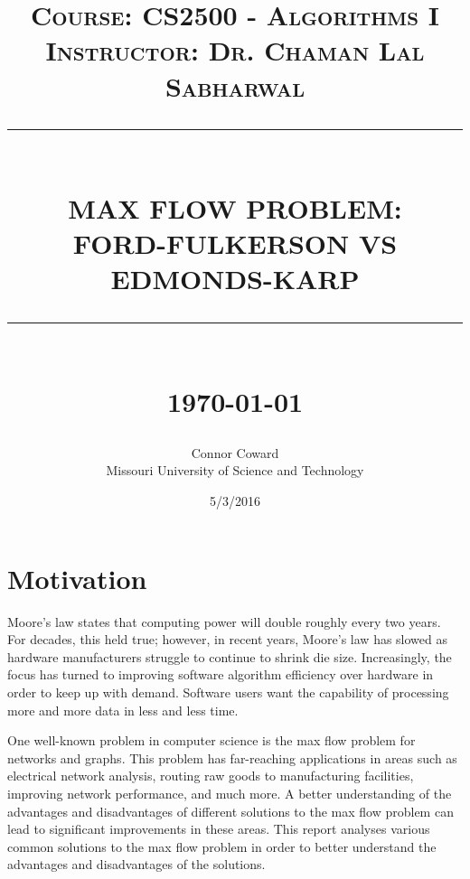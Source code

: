 \documentclass[12pt]{report}
\newcommand{\HRule}[1]{\rule{\linewidth}{#1}}
\begin{document}
\title{ \normalsize \textsc{Course: CS2500 - Algorithms I} \\
		\textsc{Instructor: Dr. Chaman Lal Sabharwal}
		\\ [2.0cm]
		\HRule{0.5pt} \\
		\LARGE \textbf{\uppercase{Max Flow Problem: \\ Ford-Fulkerson vs Edmonds-Karp}}
		\HRule{0.5pt} \\ [0.5cm]
		\normalsize \today \vspace*{4\baselineskip}}

\date{5/3/2016}

\author{
		Connor Coward \\ 
		Missouri University of Science and Technology  }

\maketitle
\tableofcontents
\newpage

\sectionfont{\scshape}


\section*{Motivation}
Moore's law states that computing power will double roughly every two years. For decades, this held true; however, in recent years, Moore's law has slowed as hardware manufacturers struggle to continue to shrink die size. Increasingly, the focus has turned to improving software algorithm efficiency over hardware in order to keep up with demand. Software users want the capability of processing more and more data in less and less time. 

One well-known problem in computer science is the max flow problem for networks and graphs. This problem has far-reaching applications in areas such as electrical network analysis, routing raw goods to manufacturing facilities, improving network performance, and much more. A better understanding of the advantages and disadvantages of different solutions to the max flow problem can lead to significant improvements in these areas. This report analyses various common solutions to the max flow problem in order to better understand the advantages and disadvantages of the solutions.
\end{document}
